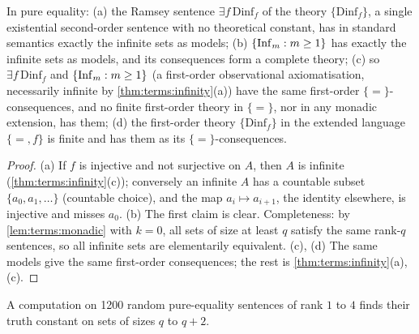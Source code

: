 \begin{proposition}\label{prop:terms:ramsey}
In pure equality:
(a) the Ramsey sentence $\exists f\,\mathrm{Dinf}_f$ of the theory $\{\mathrm{Dinf}_f\}$, a single existential second-order sentence with no theoretical constant, has in standard semantics exactly the infinite sets as models;
(b) $\{\mathrm{Inf}_{m}:m\ge1\}$ has exactly the infinite sets as models, and its consequences form a complete theory;
(c) so $\exists f\,\mathrm{Dinf}_f$ and $\{\mathrm{Inf}_{m}:m\ge1\}$ (a first-order observational axiomatisation, necessarily infinite by \cref{thm:terms:infinity}(a)) have the same first-order $\{=\}$-consequences, and no finite first-order theory in $\{=\}$, nor in any monadic extension, has them;
(d) the first-order theory $\{\mathrm{Dinf}_f\}$ in the extended language $\{=,f\}$ is finite and has them as its $\{=\}$-consequences.
\end{proposition}

\begin{proof}
(a) If $f$ is injective and not surjective on $A$, then $A$ is infinite (\cref{thm:terms:infinity}(c)); conversely an infinite $A$ has a countable subset $\{a_0,a_1,\dots\}$ (countable choice), and the map $a_i\mapsto a_{i+1}$, the identity elsewhere, is injective and misses $a_0$. (b) The first claim is clear. Completeness: by \cref{lem:terms:monadic} with $k=0$, all sets of size at least $q$ satisfy the same rank-$q$ sentences, so all infinite sets are elementarily equivalent. (c), (d) The same models give the same first-order consequences; the rest is \cref{thm:terms:infinity}(a), (c).
\end{proof}

A computation on 1200 random pure-equality sentences of rank $1$ to $4$ finds their truth constant on sets of sizes $q$ to $q+2$.

